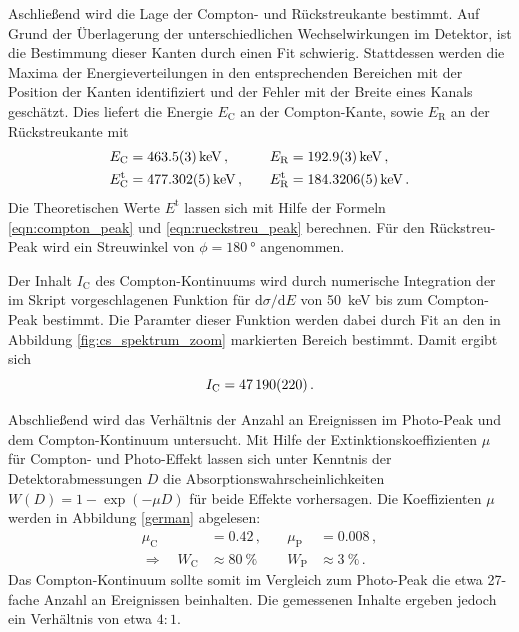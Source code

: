 Aschließend wird die Lage der Compton- und Rückstreukante bestimmt.
Auf Grund der Überlagerung der unterschiedlichen Wechselwirkungen im Detektor,
ist die Bestimmung dieser Kanten durch einen Fit schwierig.
Stattdessen werden die Maxima der Energieverteilungen in den entsprechenden
Bereichen mit der Position der Kanten identifiziert und der Fehler mit
der Breite eines Kanals geschätzt.
Dies liefert die Energie $E_\text{C}$ an der Compton-Kante, sowie $E_\text{R}$
an der Rückstreukante mit
\begin{align*}
    E_\text{C} &= \SI{463.5+-0.3}{keV}\,, &\quad E_\text{R} &= \SI{192.9+-0.3}{keV} \,,\\
    E_\text{C}^\text{t} &= \SI{477.302+-0.005}{keV}\,, &\quad E_\text{R}^\text{t} &= \SI{184.3206+-0.0005}{keV} \,.\\
\end{align*}
Die Theoretischen Werte $E^\text{t}$ lassen sich mit Hilfe der Formeln
\eqref{eqn:compton_peak} und \eqref{eqn:rueckstreu_peak} berechnen. Für
den Rückstreu-Peak wird ein Streuwinkel von $\phi = \SI{180}{\degree}$ angenommen.

Der Inhalt $I_\text{C}$ des Compton-Kontinuums wird durch numerische
Integration der im Skript vorgeschlagenen Funktion für
$\text{d}\sigma/\text{d}E$ von \SI{50}{keV} bis zum Compton-Peak bestimmt.
Die Paramter dieser Funktion werden dabei durch Fit an den in Abbildung
\ref{fig:cs_spektrum_zoom} markierten Bereich bestimmt. Damit ergibt sich
\begin{equation*}
    I_\text{C} = \num{47190+-220}\,.
\end{equation*}

Abschließend wird das Verhältnis der Anzahl an Ereignissen im Photo-Peak
und dem Compton-Kontinuum untersucht.
Mit Hilfe der Extinktionskoeffizienten $\mu$ für Compton- und Photo-Effekt
lassen sich unter Kenntnis der Detektorabmessungen $D$ die Absorptionswahrscheinlichkeiten
$W(D)=1-\exp(-\mu D)$ für beide Effekte vorhersagen. Die Koeffizienten $\mu$
werden in Abbildung \ref{german} abgelesen:
\begin{align*}
    \mu_\text{C} &= \num{0.42}\,, &\quad \mu_\text{P} &= \num{0.008}\,,\\
    \Rightarrow \quad W_\text{C} &\approx \SI{80}{\percent} &\quad W_\text{P} &\approx \SI{3}{\percent} \,.
\end{align*}
Das Compton-Kontinuum sollte somit im Vergleich zum Photo-Peak die etwa
\num{27}-fache Anzahl an Ereignissen beinhalten.
Die gemessenen Inhalte ergeben jedoch ein Verhältnis von etwa $4:1$.


